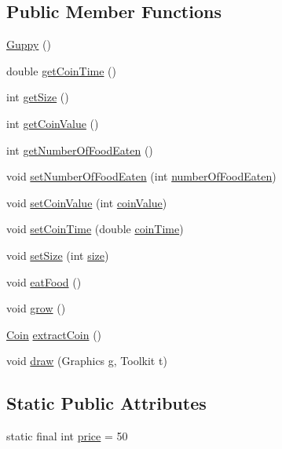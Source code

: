 \subsection*{Public Member Functions}
\begin{DoxyCompactItemize}
\item 
\mbox{\hyperlink{class_guppy_a6336822c9cc2106fad2aaa2e54d159ac}{Guppy}} ()
\item 
double \mbox{\hyperlink{class_guppy_a7279fb164e708367a71b3d8501adff97}{get\+Coin\+Time}} ()
\item 
int \mbox{\hyperlink{class_guppy_a14ca9e79a2fe085224f240e496c9905e}{get\+Size}} ()
\item 
int \mbox{\hyperlink{class_guppy_a05b113a4bac22e8214a671da03b52294}{get\+Coin\+Value}} ()
\item 
int \mbox{\hyperlink{class_guppy_a1b4fd13a880aa51ad21dd2357e5aaa2b}{get\+Number\+Of\+Food\+Eaten}} ()
\item 
void \mbox{\hyperlink{class_guppy_a90ce9ea9c330c5d8bab256a244a995e3}{set\+Number\+Of\+Food\+Eaten}} (int \mbox{\hyperlink{class_guppy_a6a7badd3d1d55d0b02f74be82bccba59}{number\+Of\+Food\+Eaten}})
\item 
void \mbox{\hyperlink{class_guppy_a22e7cfdc2493eed638c69edee5848f2d}{set\+Coin\+Value}} (int \mbox{\hyperlink{class_guppy_aa88181b53a81e582657fce01c32090e1}{coin\+Value}})
\item 
void \mbox{\hyperlink{class_guppy_a254e1b5a56245740dcdc2c41cffaf15b}{set\+Coin\+Time}} (double \mbox{\hyperlink{class_guppy_a897004763fd0148c120166ff51650a74}{coin\+Time}})
\item 
void \mbox{\hyperlink{class_guppy_addf35bc76c2053fea12a8d0aac54d177}{set\+Size}} (int \mbox{\hyperlink{class_guppy_a2424f5424eb13aab67ee61d0876aaf25}{size}})
\item 
void \mbox{\hyperlink{class_guppy_a2b234c201f80dbed1db3a58e4ee7840b}{eat\+Food}} ()
\item 
void \mbox{\hyperlink{class_guppy_aa36c77e990d4959dc81adbe457e989c3}{grow}} ()
\item 
\mbox{\hyperlink{class_coin}{Coin}} \mbox{\hyperlink{class_guppy_aa78a5306116056c8b4bedcf79bae6ad3}{extract\+Coin}} ()
\item 
void \mbox{\hyperlink{class_guppy_ad04fab448adc11ff3eecf3a76c64781b}{draw}} (Graphics g, Toolkit t)
\end{DoxyCompactItemize}
\subsection*{Static Public Attributes}
\begin{DoxyCompactItemize}
\item 
static final int \mbox{\hyperlink{class_guppy_a711b1ce05b2a4e55af2bbab10876a56d}{price}} = 50
\end{DoxyCompactItemize}
